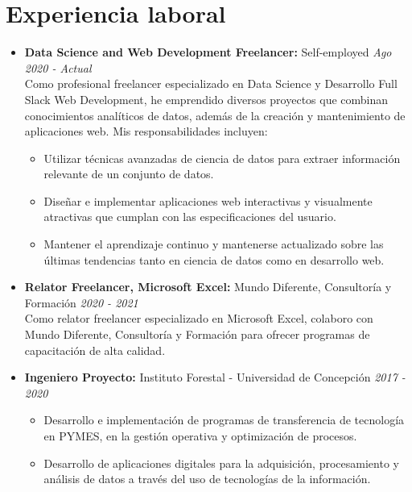 \documentclass[a4paper,10pt]{article}
\begin{document}
	\section*{Experiencia laboral}
	\begin{itemize}[left=0pt]
		\item \textbf{\large Data Science and Web Development Freelancer:} Self-employed \hfill \textit{Ago 2020 - Actual} \\
		\small Como profesional freelancer especializado en Data Science y Desarrollo Full Slack Web Development, he emprendido diversos proyectos que combinan conocimientos analíticos de datos, además de la creación y mantenimiento de aplicaciones web. Mis responsabilidades incluyen:
		\begin{itemize}[left=10pt]
			\item Utilizar técnicas avanzadas de ciencia de datos para extraer información relevante de un conjunto de datos.
			\item Diseñar e implementar aplicaciones web interactivas y visualmente atractivas que cumplan con las especificaciones del usuario.
			\item Mantener el aprendizaje continuo y mantenerse actualizado sobre las últimas tendencias tanto en ciencia de datos como en desarrollo web.
		\end{itemize}
		
		\item \textbf{\large Relator Freelancer, Microsoft Excel:} Mundo Diferente, Consultoría y Formación \hfill \textit{2020 - 2021} \\
		\small Como relator freelancer especializado en Microsoft Excel, colaboro con Mundo Diferente, Consultoría y Formación para ofrecer programas de capacitación de alta calidad. 
		
		\item \textbf{\large Ingeniero Proyecto:} Instituto Forestal - Universidad de Concepción \hfill \textit{2017 - 2020}
		\begin{itemize}[left=10pt, topsep=0pt]
			\item Desarrollo e implementación de programas de transferencia de tecnología en PYMES, en la gestión operativa y optimización de procesos.
			\item Desarrollo de aplicaciones digitales para la adquisición, procesamiento y análisis de datos a través del uso de tecnologías de la información.
		\end{itemize}
		

\end{itemize}
\end{document}
